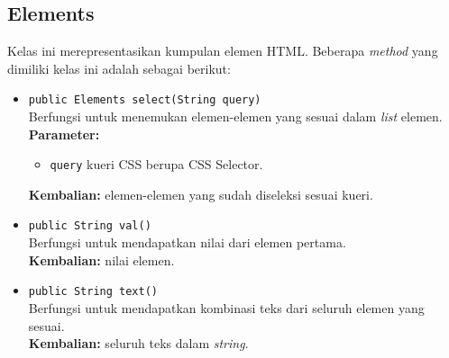 \subsection{Elements}
Kelas ini merepresentasikan kumpulan elemen HTML. Beberapa \textit{method} yang dimiliki kelas ini adalah sebagai berikut:
\begin{itemize}
	    \item \texttt{public Elements select(String query)} \\
		Berfungsi untuk menemukan elemen-elemen yang sesuai dalam \textit{list} elemen. \\
		\textbf{Parameter:} 
		\begin{itemize}
			\item \texttt{query} kueri CSS berupa CSS Selector.
		\end{itemize}
		\textbf{Kembalian:} elemen-elemen yang sudah diseleksi sesuai kueri.	
		
		\item \texttt{public String val()} \\
		Berfungsi untuk mendapatkan nilai dari elemen pertama. \\
		\textbf{Kembalian:} nilai elemen.	
		
		\item \texttt{public String text()} \\
		Berfungsi untuk mendapatkan kombinasi teks dari seluruh elemen yang sesuai. \\
		\textbf{Kembalian:} seluruh teks dalam \textit{string}.	
\end{itemize}


